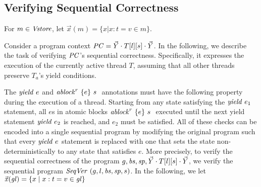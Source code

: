 \subsection{Verifying Sequential Correctness}
For $m \in \Vstore$, let $ \vec{x}(m) = \{ x  |   x : t = v \in m \} $. 

Consider a program context $\ProgCtxt = \YieldingThreads \cdot T[\varsL][s] \cdot \YieldingThreads$. In the following, we describe the task of verifying $\ProgCtxt$'s sequential correctness. Specifically, it expresses the execution of the currently active thread $T$, assuming that all other threads preserve $T_a$'s yield conditions.

The $\yield{e}$ and $\ablock{e}{s}{r}$ annotations must have the following property during the execution of a thread. Starting from any state satisfying the $\yield{e_1}$ statement, all $e$s in atomic blocks $\ablock{e}{s}{r}$ executed until the next yield statement $\yield{e_2}$ is reached, and $e_2$ must be satisfied. All of these checks can be encoded into a single sequential program by modifying the original program such that every $\yield{e}$ statement is replaced with one that sets the state non-deterministically to any state that satisfies $e$. More precisely, to verify the sequential correctness of the program $\varsG, \bodies, \specs, \YieldingThreads \cdot T[\varsL][s] \cdot \YieldingThreads$, we verify the sequential program $\SeqVer(\varsG, \varsL, \bodies, \specs, s)$. In the following, we let 
$\xs(\vars) = \{x \mid x:t = v \in \vars\}$



